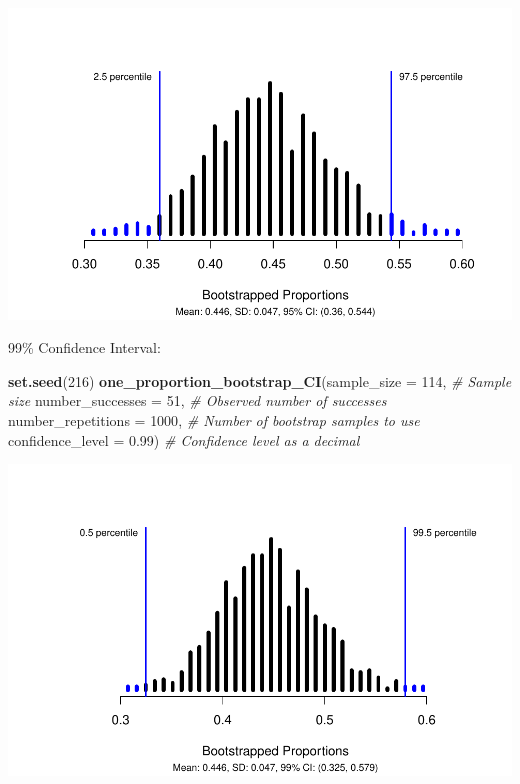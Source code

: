 \documentclass[
]{report}
\newenvironment{Shaded}{\begin{snugshade}}{\end{snugshade}}
\newcommand{\AttributeTok}[1]{\textcolor[rgb]{0.13,0.29,0.53}{#1}}
\newcommand{\CommentTok}[1]{\textcolor[rgb]{0.56,0.35,0.01}{\textit{#1}}}
\newcommand{\DecValTok}[1]{\textcolor[rgb]{0.00,0.00,0.81}{#1}}
\newcommand{\FloatTok}[1]{\textcolor[rgb]{0.00,0.00,0.81}{#1}}
\newcommand{\FunctionTok}[1]{\textcolor[rgb]{0.13,0.29,0.53}{\textbf{#1}}}
\newcommand{\NormalTok}[1]{#1}
\begin{document}
\begin{center}\includegraphics[width=0.7\linewidth]{06-LN06-1cat_simulation_files/figure-latex/unnamed-chunk-4-1} \end{center}

99\% Confidence Interval:

\begin{Shaded}
\begin{Highlighting}[]
\FunctionTok{set.seed}\NormalTok{(}\DecValTok{216}\NormalTok{)}
\FunctionTok{one\_proportion\_bootstrap\_CI}\NormalTok{(}\AttributeTok{sample\_size =} \DecValTok{114}\NormalTok{, }\CommentTok{\# Sample size}
                    \AttributeTok{number\_successes =} \DecValTok{51}\NormalTok{, }\CommentTok{\# Observed number of successes}
                    \AttributeTok{number\_repetitions =} \DecValTok{1000}\NormalTok{, }\CommentTok{\# Number of bootstrap samples to use}
                    \AttributeTok{confidence\_level =} \FloatTok{0.99}\NormalTok{) }\CommentTok{\# Confidence level as a decimal}
\end{Highlighting}
\end{Shaded}

\begin{center}\includegraphics[width=0.7\linewidth]{06-LN06-1cat_simulation_files/figure-latex/unnamed-chunk-5-1} \end{center}

\newpage
\end{document}
